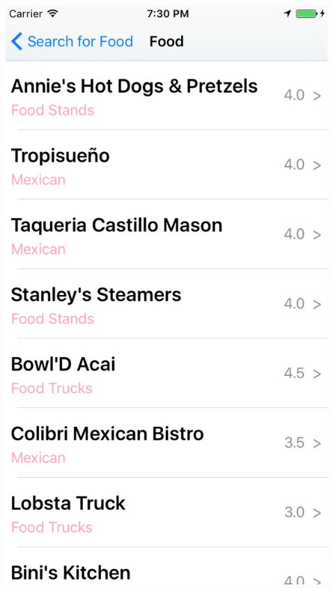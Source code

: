 \documentclass{beamer}
\begin{document}
\begin{frame}
\begin{columns}
\begin{column}{0.3\textwidth}
\begin{center}
        \end{center}
    \end{column}
    \begin{column}{0.3\textwidth}  %
        \begin{center}
            \includegraphics[scale=0.3]{foodTable}
        \end{center}
    \end{column}
    \begin{column}{0.3\textwidth}  %

\end{column}
\end{columns}
\end{frame}
\end{document}

